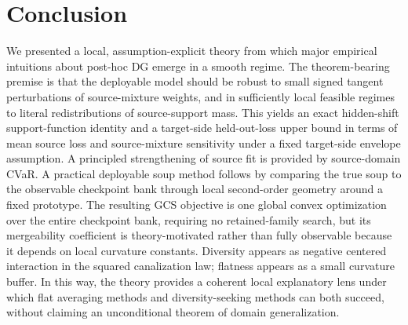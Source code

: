 \documentclass[11pt]{article}
\newcommand{\1}{\mathbf{1}}
\theoremstyle{plain}
\theoremstyle{definition}
\theoremstyle{remark}
\begin{document}
\section{Conclusion}
We presented a local, assumption-explicit theory from which major empirical intuitions about post-hoc DG emerge in a smooth regime. The theorem-bearing premise is that the deployable model should be robust to small signed tangent perturbations of source-mixture weights, and in sufficiently local feasible regimes to literal redistributions of source-support mass. This yields an exact hidden-shift support-function identity and a target-side held-out-loss upper bound in terms of mean source loss and source-mixture sensitivity under a fixed target-side envelope assumption. A principled strengthening of source fit is provided by source-domain CVaR. A practical deployable soup method follows by comparing the true soup to the observable checkpoint bank through local second-order geometry around a fixed prototype. The resulting GCS objective is one global convex optimization over the entire checkpoint bank, requiring no retained-family search, but its mergeability coefficient is theory-motivated rather than fully observable because it depends on local curvature constants. Diversity appears as negative centered interaction in the squared canalization law; flatness appears as a small curvature buffer. In this way, the theory provides a coherent local explanatory lens under which flat averaging methods and diversity-seeking methods can both succeed, without claiming an unconditional theorem of domain generalization.
\end{document}
